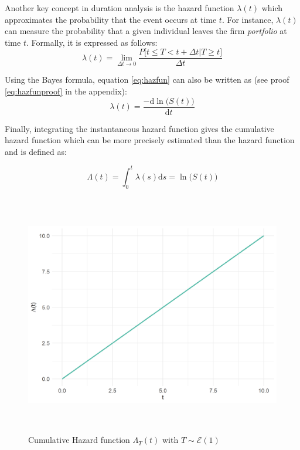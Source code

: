 \documentclass[
]{book}
\begin{document}
Another key concept in duration analysis is the hazard function \(\lambda(t)\) which approximates the probability that the event occurs at time \(t\). For instance, \(\lambda(t)\) can measure the probability that a given individual leaves the firm \emph{portfolio} at time \(t\). Formally, it is expressed as follows:
\begin{equation}
  \lambda(t) = \lim_{\Delta t \to 0} \frac{P\big[t \leq T < t + \Delta t | T \geq t \big]}{\Delta t}
  \label{eq:hazfun}
\end{equation}

Using the Bayes formula, equation \eqref{eq:hazfun} can also be written as (see proof \eqref{eq:hazfunproof} in the appendix):
\begin{equation}
  \lambda(t) = \frac{-\text{d} \ln \big(S(t)\big)}{\text{d} t}
  \label{eq:hazfunbis}
\end{equation}

Finally, integrating the instantaneous hazard function gives the cumulative hazard function which can be more precisely estimated than the hazard function \citep{CAMERON_TRIVEDI} and is defined as:

\begin{equation}
  \Lambda (t) = \int_{0}^{t} \lambda(s) \text{d}s = \ln \big(S(t)\big)
  \label{eq:cumhazfun}
\end{equation}

\begin{figure}

{\centering \includegraphics[width=400pt,height=300pt]{./imgs/cum_haz_plot} 

}

\caption{Cumulative Hazard function $\Lambda_T(t)$ with $T \sim \mathcal{E} (1)$}\label{fig:cumhazplot}
\end{figure}
\end{document}

